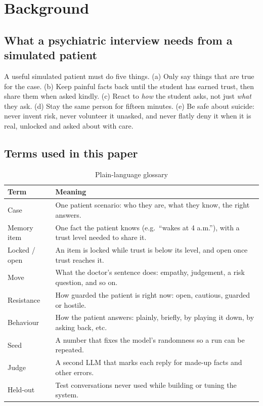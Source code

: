 \documentclass[twoside,11pt]{article}
\begin{document}
\section{Background}
\subsection{What a psychiatric interview needs from a simulated patient}
A useful simulated patient must do five things. (a) Only say things that are true for the case. (b) Keep painful facts back until the student has earned trust, then share them when asked kindly. (c) React to \emph{how} the student asks, not just \emph{what} they ask. (d) Stay the same person for fifteen minutes. (e) Be safe about suicide: never invent risk, never volunteer it unasked, and never flatly deny it when it is real, unlocked and asked about with care.

\subsection{Terms used in this paper}
\begin{table}[h]
\caption{Plain-language glossary}
\label{tab:glossary}
\centering
\footnotesize
\begin{tabularx}{\columnwidth}{@{}lY@{}}
\toprule
Term & Meaning\\
\midrule
Case & One patient scenario: who they are, what they know, the right answers.\\
Memory item & One fact the patient knows (e.g.\ ``wakes at 4 a.m.''), with a trust level needed to share it.\\
Locked / open & An item is locked while trust is below its level, and open once trust reaches it.\\
Move & What the doctor's sentence does: empathy, judgement, a risk question, and so on.\\
Resistance & How guarded the patient is right now: open, cautious, guarded or hostile.\\
Behaviour & How the patient answers: plainly, briefly, by playing it down, by asking back, etc.\\
Seed & A number that fixes the model's randomness so a run can be repeated.\\
Judge & A second LLM that marks each reply for made-up facts and other errors.\\
Held-out & Test conversations never used while building or tuning the system.\\
\bottomrule
\end{tabularx}
\end{table}
\end{document}
